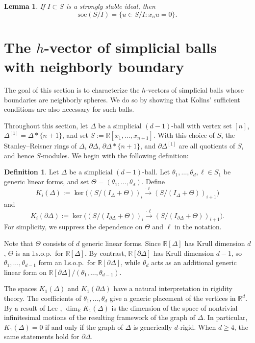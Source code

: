 \documentclass[11pt]{article}
\newtheorem{lemma}[theorem]{Lemma}
\theoremstyle{definition}
\newtheorem{definition}[theorem]{Definition}
\numberwithin{equation}{theorem}
\newcommand{\kk}{{\mathbb R}}
\newcommand{\Soc}{\mathrm{soc}}
\begin{document}
\begin{lemma}
\label{sstablesocle}
If $I \subset S$ is a strongly stable ideal, then
\[
\Soc(S/I)= \{u \in S/I : x_n u =0\}.
\]
\end{lemma}






\section{The $h$-vector of simplicial balls with neighborly boundary}\label{sec:neighborly}

The goal of this section is to characterize the $h$-vectors of simplicial balls whose boundaries are neighborly spheres. We do so by showing that Kolins’ sufficient conditions are also necessary for such balls.


Throughout this section, let $\Delta$ be a simplicial $(d-1)$-ball with vertex set $[n]$, $\Delta^{[1]}=\Delta*\{n+1\}$,  and set $S:=\kk[x_1,\dots,x_{n+1}]$. With this choice of $S$, the Stanley--Reisner rings of $\Delta$, $\partial\Delta$, $\partial\Delta*\{n+1\}$, and $\partial\Delta^{[1]}$ are all quotients of $S$, and hence $S$-modules. We begin with the following definition:

\begin{definition}\label{def:K}
    Let $\Delta$ be a simplicial $(d-1)$-ball. Let $\theta_1,\ldots,\theta_d,\ell\in S_1$ be generic linear forms, and set $\Theta=(\theta_1,\ldots,\theta_d)$. Define
    \[
    K_i(\Delta):=\ker\bigl((S/(I_\Delta+\Theta))_i\xrightarrow{\cdot\ell}(S/(I_\Delta+\Theta))_{i+1}\bigr)
    \]
    and
    \[
    K_i(\partial\Delta):=\ker\bigl((S/(I_{\partial\Delta}+\Theta))_i\xrightarrow{\cdot\ell}(S/(I_{\partial\Delta}+\Theta))_{i+1}\bigr).
    \]
For simplicity, we suppress the dependence on $\Theta$ and $\ell$ in the notation.
\end{definition}



Note that $\Theta$ consists of $d$ generic linear forms. Since $\kk[\Delta]$ has Krull dimension $d$, $\Theta$ is an l.s.o.p.\ for $\kk[\Delta]$. By contrast, $\kk[\partial\Delta]$ has Krull dimension $d-1$, so $\theta_1,\ldots,\theta_{d-1}$ form an l.s.o.p.\ for $\kk[\partial\Delta]$, while $\theta_d$ acts as an additional generic linear form on $\kk[\partial\Delta]/(\theta_1,\ldots,\theta_{d-1})$.

The spaces $K_1(\Delta)$ and $K_1(\partial\Delta)$ have a natural interpretation in rigidity theory. The coefficients of $\theta_1,\ldots,\theta_d$ give a generic placement of the vertices in $\kk^d$. By a result of Lee \cite{Lee1996}, $\dim_\kk K_1(\Delta)$ is the dimension of the space of nontrivial infinitesimal motions of the resulting framework of the graph of $\Delta$. In particular, $K_1(\Delta)=0$ if and only if the graph of $\Delta$ is generically $d$-rigid. When $d\geq 4$, the same statements hold for $\partial\Delta$.
\end{document}
